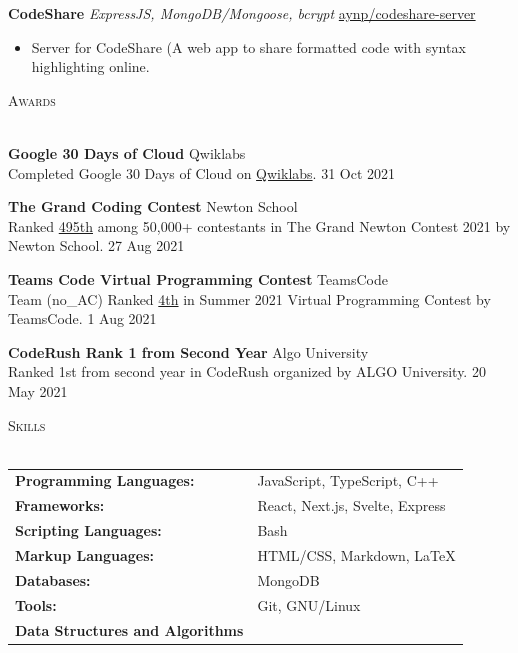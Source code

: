 \documentclass[a4paper]{article}
\newcommand{\lineunder} {
    \vspace*{-8pt} \\
    \hspace*{-18pt} \hrulefill \\
}
\newcommand{\header} [1] {
    {\hspace*{-18pt}\vspace*{6pt} \textsc{#1}}
    \vspace*{-6pt} \lineunder
}
\begin{document}
{\textbf{CodeShare}} {\sl ExpressJS, MongoDB/Mongoose, bcrypt} \hfill \href{https://github.com/aynp/codeshare-server}{aynp/codeshare-server}\\
\begin{itemize}
	\item Server for CodeShare (A web app to share formatted code with syntax highlighting online.
\end{itemize}
\vspace*{1.5mm}



\header{Awards}
\vspace{1mm}

\textbf{Google 30 Days of Cloud} \hfill Qwiklabs\\
Completed Google 30 Days of Cloud on \href{https://www.qwiklabs.com/public_profiles/4c78c6d8-ad43-4991-b8fe-03e559c1bac5}{Qwiklabs}. \hfill 31 Oct 2021\\
\vspace*{1mm}

\textbf{The Grand Coding Contest} \hfill Newton School\\
Ranked \href{https://www.linkedin.com/posts/aryanpathania03_aryan-has-secured-rank-495-in-newtons-grand-activity-6841777869484642304-YhKD}{495th} among 50,000+ contestants in The Grand Newton Contest 2021 by Newton School. \hfill 27 Aug 2021\\
\vspace*{1mm}

\textbf{Teams Code Virtual Programming Contest} \hfill TeamsCode\\
Team (no\_AC) Ranked \href{https://youtu.be/eCylTCHctY0?t=16137}{4th} in Summer 2021 Virtual Programming Contest by TeamsCode. \hfill 1 Aug 2021\\
\vspace*{1mm}

\textbf{CodeRush Rank 1 from Second Year} \hfill Algo University\\
Ranked 1st from second year in CodeRush organized by ALGO University. \hfill 20 May 2021\\
\vspace*{1.5mm}



\header{Skills}
\vspace{1mm}
\begin{tabular}{ l l }
	\textbf{Programming Languages:} & JavaScript, TypeScript, C++ \\
	\textbf{Frameworks:} & React, Next.js, Svelte, Express \\
	\textbf{Scripting Languages:} & Bash \\
	\textbf{Markup Languages:} & HTML/CSS, Markdown, \LaTeX \\
	\textbf{Databases:} & MongoDB \\
	\textbf{Tools:} & Git, GNU/Linux \\
	\textbf{Data Structures and Algorithms} \\
\end{tabular}
\vspace{1.5mm}
\end{document}
